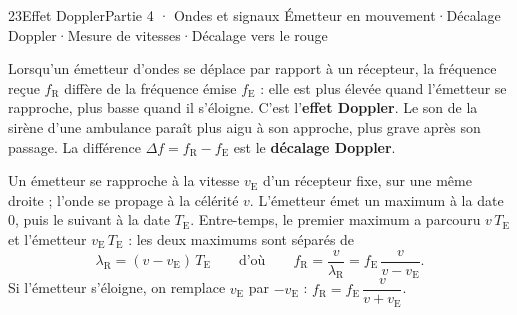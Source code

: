 \begin{ouverture}[doppler]{23}{Effet Doppler}{Partie 4 · Ondes et signaux}
{Émetteur en mouvement\enspace·\enspace Décalage Doppler\enspace·\enspace Mesure de vitesses\enspace·\enspace Décalage vers le rouge}
\end{ouverture}
\essentiel
{}
\begin{definition}
Lorsqu'un émetteur d'ondes se déplace par rapport à un récepteur, la fréquence reçue $f_\mathrm{R}$ diffère de la fréquence
émise $f_\mathrm{E}$ : elle est plus élevée quand l'émetteur se rapproche, plus basse quand il s'éloigne. C'est l'\textbf{effet
Doppler}. Le son de la sirène d'une ambulance paraît plus aigu à son approche, plus grave après son passage. La
différence $\Delta f=f_\mathrm{R}-f_\mathrm{E}$ est le \textbf{décalage Doppler}.
\end{definition}
\begin{savoirfaire}
Un émetteur se rapproche à la vitesse $v_\mathrm{E}$ d'un récepteur fixe, sur une même droite ; l'onde se propage à la
célérité $v$. L'émetteur émet un maximum à la date 0, puis le suivant à la date $T_\mathrm{E}$. Entre-temps, le premier
maximum a parcouru $v\,T_\mathrm{E}$ et l'émetteur $v_\mathrm{E}\,T_\mathrm{E}$ : les deux maximums sont séparés de
\[\lambda_\mathrm{R}=(v-v_\mathrm{E})\,T_\mathrm{E}\qquad\text{d'où}\qquad f_\mathrm{R}=\frac{v}{\lambda_\mathrm{R}}=f_\mathrm{E}\,\frac{v}{v-v_\mathrm{E}}.\]
Si l'émetteur s'éloigne, on remplace $v_\mathrm{E}$ par $-v_\mathrm{E}$ : $f_\mathrm{R}=f_\mathrm{E}\,\dfrac{v}{v+v_\mathrm{E}}$.
\end{savoirfaire}
